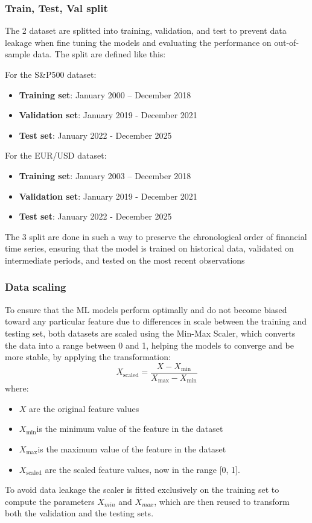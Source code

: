 \subsubsection{Train, Test, Val split}

The 2 dataset are splitted into training, validation, and test to prevent data leakage when fine tuning the models and evaluating the performance on out-of-sample data.
The split are defined like this: 

For the S\&P500 dataset: 
\begin{itemize}
    \item \textbf{Training set}: January 2000 – December 2018
    \item \textbf{Validation set}: January 2019 - December 2021
    \item \textbf{Test set}: January 2022 - December 2025
\end{itemize}
For the EUR/USD dataset: 
\begin{itemize}
    \item \textbf{Training set}: January 2003 – December 2018
    \item \textbf{Validation set}: January 2019 - December 2021
    \item \textbf{Test set}: January 2022 - December 2025
\end{itemize}
The 3 split are done in such a way to preserve the chronological order of financial time series, ensuring that the model is trained on historical data, validated on intermediate periods, and tested on the most recent observations

\subsubsection{Data scaling}

To ensure that the ML models perform optimally and do not become biased toward any particular feature due to differences in scale between the training and testing set, both datasets are scaled using the Min-Max Scaler, which converts the data into a range between 0 and 1, helping the models to converge and be more stable, by applying the transformation:
\[
X_{\text{scaled}} = \frac{X - X_{\text{min}}}{X_{\text{max}} - X_{\text{min}}}
\]
where: 
\begin{itemize}
    \item \( X \) are the original feature values
    \item \( X_{\text{min}} \)is the minimum value of the feature in the dataset
    \item \( X_{\text{max}} \)is the maximum value of the feature in the dataset
    \item \( X_{\text{scaled}} \) are the scaled feature values, now in the range [0, 1].
\end{itemize}
To avoid data leakage the scaler is fitted exclusively on the training set to compute the parameters $X_{min}$ and $X_{max}$, which are then reused to transform both the validation and the testing sets.


